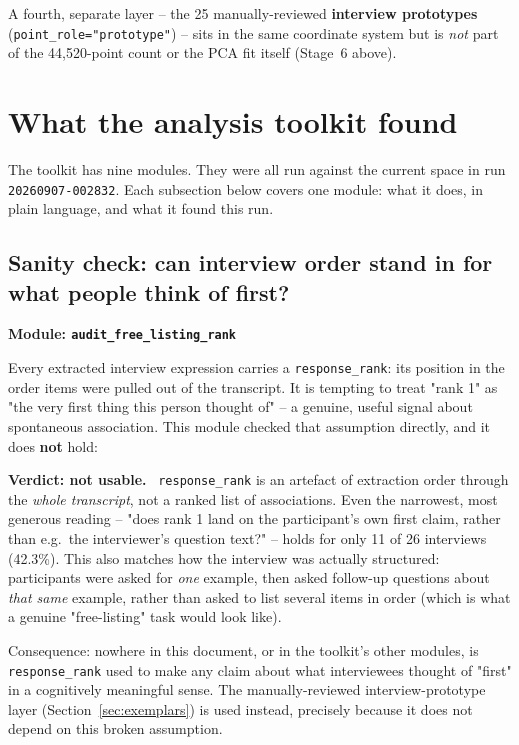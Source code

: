 \documentclass[11pt,a4paper]{article}
\newenvironment{plainbox}[1][Note]
  {\par\vspace{6pt}\noindent{\color{noteline}\rule{\linewidth}{0.6pt}}\par\vspace{3pt}
   \noindent\small\textbf{#1.}\ \ignorespaces}
  {\par\vspace{3pt}\noindent{\color{noteline}\rule{\linewidth}{0.6pt}}\vspace{6pt}\par}
\newcommand{\jargon}[1]{\textbf{#1}}
\begin{document}
A fourth, separate layer -- the 25 manually-reviewed \textbf{interview
prototypes} (\texttt{point\_role="prototype"}) -- sits in the same
coordinate system but is \emph{not} part of the 44,520-point count or
the PCA fit itself (Stage~6 above).

\section{What the analysis toolkit found}
\label{sec:results}

The toolkit has nine modules. They were all run against the current
space in run \texttt{20260907-002832}. Each subsection below covers one
module: what it does, in plain language, and what it found this run.

\subsection{Sanity check: can interview order stand in for what people think of first?}
\jargon{Module: \texttt{audit\_free\_listing\_rank}}

Every extracted interview expression carries a \texttt{response\_rank}:
its position in the order items were pulled out of the transcript. It is
tempting to treat "rank 1" as "the very first thing this person thought
of" -- a genuine, useful signal about spontaneous association. This
module checked that assumption directly, and it does \textbf{not} hold:

\begin{plainbox}[Verdict: not usable]
\texttt{response\_rank} is an artefact of extraction order through the
\emph{whole transcript}, not a ranked list of associations. Even the
narrowest, most generous reading -- "does rank 1 land on the
participant's own first claim, rather than e.g.\ the interviewer's
question text?" -- holds for only 11 of 26 interviews (42.3\%). This
also matches how the interview was actually structured: participants
were asked for \emph{one} example, then asked follow-up questions about
\emph{that same} example, rather than asked to list several items in
order (which is what a genuine "free-listing" task would look like).
\end{plainbox}

Consequence: nowhere in this document, or in the toolkit's other
modules, is \texttt{response\_rank} used to make any claim about what
interviewees thought of "first" in a cognitively meaningful sense. The
manually-reviewed interview-prototype layer (Section~\ref{sec:exemplars})
is used instead, precisely because it does not depend on this broken
assumption.
\end{document}
